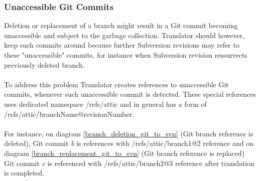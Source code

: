 \subsubsection{Unaccessible Git Commits}
Deletion or replacement of a branch might result in a Git commit becoming unaccessible and subject to the 
garbage collection. Translator should however, keep such commits around because further Subversion revisions 
may refer to these "unaccessible" commits, for instance when Subversion revision ressurrects previously
deleted branch.
\\\\
To address this problem Translator creates references to unaccessible Git commits, 
whenever such unaccessible commit is detected. 
These special references uses dedicated namespace /refs/attic and in general has a form of /refs/attic/branchName@revisionNumber.
\\\\
For instance, on diagram \ref{branch_deletion_git_to_svn} (Git branch reference is deleted), Git commit \emph{b} is references with /refs/attic/branch1@2 reference and on
diagram \ref{branch_replacement_git_to_svn} (Git branch reference is replaced) Git commit \emph{c} is referenced with /refs/attic/branch2@3 reference
after translation is completed.